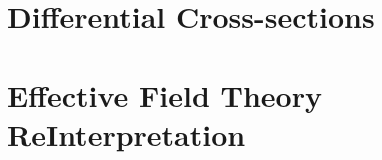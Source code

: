 \label{sec:Results}

\section{ Differential Cross-sections }
\label{sec:DifferentialxS}


\section{Effective Field Theory ReInterpretation}
\label{sec:EFT}

